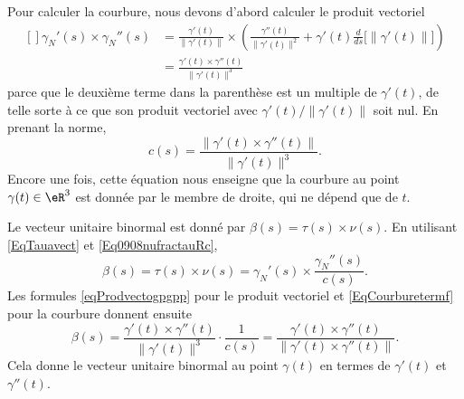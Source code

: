 Pour calculer la courbure, nous devons d'abord calculer le produit vectoriel
\begin{equation}        \label{eqProdvectogpgpp}
	\begin{aligned}[]
		\gamma_N'(s)\times \gamma_N''(s) & =  \frac{ \gamma'(t) }{ \| \gamma'(t) \| }\times \left( \frac{ \gamma''(t) }{ \| \gamma'(t) \|^2 }+\gamma'(t)\frac{ d }{ ds }\Big[ \| \gamma'(t) \| \Big] \right) \\
		                                 & =\frac{ \gamma'(t)\times \gamma''(t) }{ \| \gamma'(t) \|^3 }
	\end{aligned}
\end{equation}
parce que le deuxième terme dans la parenthèse est un multiple de \( \gamma'(t)\), de telle sorte à ce que son produit vectoriel avec \( \gamma'(t)/\| \gamma'(t) \|\) soit nul. En prenant la norme,
\begin{equation}        \label{EqCourburetermf}
	c(s)=\frac{ \| \gamma'(t)\times \gamma''(t) \| }{ \| \gamma'(t) \|^3 }.
\end{equation}
Encore une fois, cette équation nous enseigne que la courbure au point \( \gamma(t)\in\eR^3\) est donnée par le membre de droite, qui ne dépend que de \( t\).

Le vecteur unitaire binormal est donné par \( \beta(s)=\tau(s)\times \nu(s)\). En utilisant \eqref{EqTauavect} et \eqref{Eq0908nufractauRc},
\begin{equation}
	\beta(s)=\tau(s)\times\nu(s)=\gamma_N'(s)\times \frac{ \gamma_N''(s) }{ c(s) }.
\end{equation}
Les formules \eqref{eqProdvectogpgpp} pour le produit vectoriel et \eqref{EqCourburetermf} pour la courbure donnent ensuite
\begin{equation}
	\beta(s)=\frac{ \gamma'(t)\times \gamma''(t) }{ \| \gamma'(t) \|^3 }\cdot\frac{1}{ c(s) }=\frac{ \gamma'(t)\times \gamma''(t) }{ \|  \gamma'(t)\times \gamma''(t)  \| }.
\end{equation}
Cela donne le vecteur unitaire binormal au point \( \gamma(t)\) en termes de \( \gamma'(t)\) et \( \gamma''(t)\).

